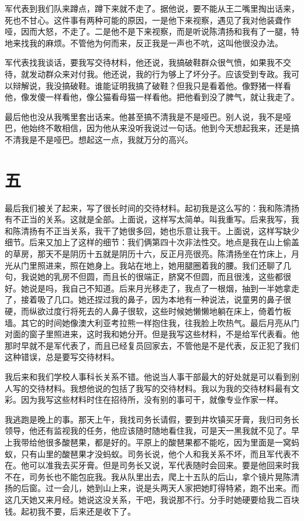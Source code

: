  军代表到我们队来蹲点，蹲下来就不走了。据他说，要不能从王二嘴里掏出话来，死也不甘心。这件事有两种可能的原因，一是他下来视察，遇见了我对他装聋作哑，因而大怒，不走了。二是他不是下来视察，而是听说陈清扬和我有了一腿，特地来找我的麻烦。不管他为何而来，反正我是一声也不吭，这叫他很没办法。 
 
 军代表找我谈话，要我写交待材料，他还说，我搞破鞋群众很气愤，如果我不交待，就发动群众来对付我。他还说，我的行为够上了坏分子。应该受到专政。我可以辩解说，我没搞破鞋。谁能证明我搞了破鞋？但我只是看着他。像野猪一样看他，像发傻一样看他，像公猫看母猫一样看他。把他看到没了脾气，就让我走了。 
 
 最后他也没从我嘴里套出话来。他甚至搞不清我是不是哑巴。别人说，我不是哑巴，他始终不敢相信，因为他从来没听我说过一句话。他到今天想起我来，还是搞不清我是不是哑巴。想起这一点，我就万分的高兴。 
 
 
\section{五} 
 
最后我们被关了起来，写了很长时间的交待材料。起初我是这么写的：我和陈清扬有不正当的关系。这就是全部。上面说，这样写太简单。叫我重写。后来我写，我和陈清扬有不正当关系，我干了她很多回，她也乐意让我干。上面说，这样写缺少细节。后来又加上了这样的细节：我们俩第四十次非法性交。地点是我在山上偷盖的草房，那天不是阴历十五就是阴历十六，反正月亮很亮。陈清扬坐在竹床上，月光从门里照进来，照在她身上。我站在地上，她用腿圈着我的腰。我们还聊了几句，我说她的乳房不但圆，而且长的很端正，脐窝不但圆，而且很浅，这些都很好。她说是吗，我自己不知道。后来月光移走了，我点了一根烟，抽到一半她拿走了，接着吸了几口。她还捏过我的鼻子，因为本地有一种说法，说童男的鼻子很硬，而纵欲过度行将死去的人鼻子很软，这些时候她懒懒地躺在床上，倚着竹板墙。其它的时间她像澳大利亚考拉熊一样抱住我，往我脸上吹热气。最后月亮从门对面的窗子里照进来，这时我和她分开。但是我写这些材料，不是给军代表看。他那时早就不是军代表了，而且已经复员回家去，不管他是不是代表，反正犯了我们这种错误，总是要写交待材料。 
 
 我后来和我们学校人事科长关系不错。他说当人事干部最大的好处就是可以看到别人写的交待材料。我想他说的包括了我写的交待材料。我以为我的交待材料最有文彩。因为我写这些材料时住在招待所，没有别的事可干，就像专业作家一样。 
 
 我逃跑是晚上的事。那天上午，我找司务长请假，要到井坎镇买牙膏，我归司务长领导，他还有监视我的任务，他应该随时随地看住我，可是天一黑我就不见了。早上我带给他很多酸琶果，都是好的。平原上的酸琶果都不能吃，因为里面是一窝蚂蚁，只有山里的酸琶果才没蚂蚁。司务长说，他个人和我关系不坏，而且军代表不在。他可以准我去买牙膏。但是司务长又说，军代表随时会回来。要是他回来时我不在，司务长也不能包庇我。我从队里出去，爬上十五队的后山，拿个镜片晃陈清扬的后窗。过一会儿，她到山上来，说是头两天人家把她盯得特紧，跑不出来。而这几天她又来月经。她说这没关系，干吧，我说那不行。分手时她硬要给我二百块钱。起初我不要，后来还是收下了。 
 
